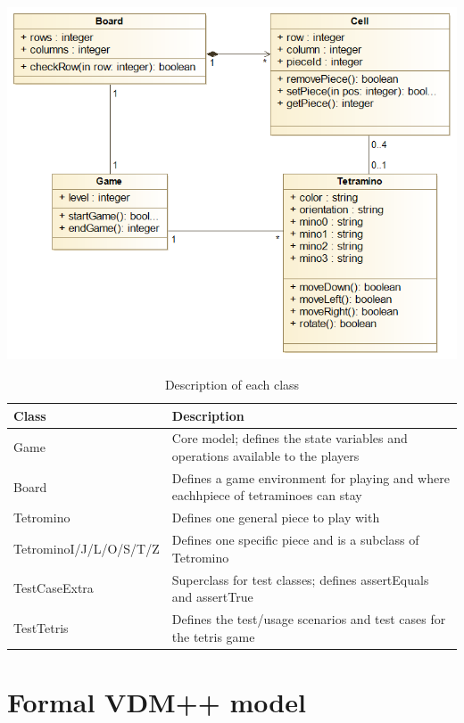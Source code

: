 \documentclass[a4paper]{article}
\begin{document}
\begin{center}
	\includegraphics[scale=0.4]{resources/img/uml}
	\label{uml}
\end{center}

\begin{table}[!h]
	\centering
	\label{description-classes}
	\begin{tabular}{|l|p{8cm}|}
	\hline
	\textbf{Class} 			   & \textbf{Description}	\\	\hline
	Game		   			   &	Core model; defines the state variables and operations available to the players	\\	\hline
	Board		   			   &	Defines a game environment for playing and where eachhpiece of tetraminoes can stay \\	\hline
	Tetromino	   			   &	Defines one general piece to play with	\\	\hline
	TetrominoI/J/L/O/S/T/Z	   &	Defines one specific piece and is a subclass of Tetromino \\	\hline
	TestCaseExtra  			   &	Superclass for test classes; defines assertEquals and assertTrue	\\	\hline
	TestTetris	   			   &	Defines the test/usage scenarios and test cases for the tetris game	\\	\hline
	\end{tabular}
	\caption{Description of each class}
\end{table}

\section{Formal VDM++ model}
\end{document}
